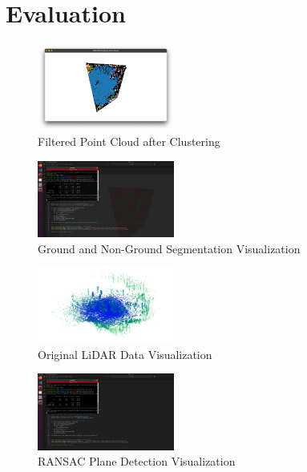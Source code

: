 \documentclass[../report.tex]{subfiles}
\begin{document}
\section{Evaluation}
\label{sec:evaluation}

\begin{figure}[H]
    \centering
    \includegraphics[width=0.4\textwidth]{rnd-project-report-main/figures/Clustering_2_filtered_pointcloud_2.png}
    \caption{Filtered Point Cloud after Clustering}
\end{figure}

\begin{figure}[H]
    \centering
    \includegraphics[width=0.4\textwidth]{rnd-project-report-main/figures/ground_non_ground_visualization.jpg}
    \caption{Ground and Non-Ground Segmentation Visualization}
\end{figure}

\begin{figure}[H]
    \centering
    \includegraphics[width=0.4\textwidth]{rnd-project-report-main/figures/Original_data.png}
    \caption{Original LiDAR Data Visualization}
\end{figure}

\begin{figure}[H]
    \centering
    \includegraphics[width=0.4\textwidth]{rnd-project-report-main/figures/ransac_visualization.jpg}
    \caption{RANSAC Plane Detection Visualization}
\end{figure}
\end{document}
